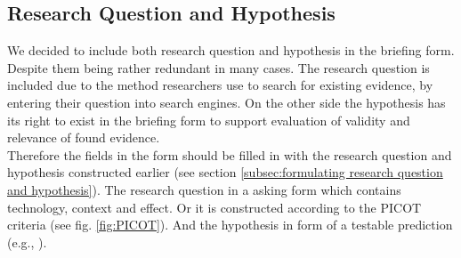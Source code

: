 \subsection{Research Question and Hypothesis}
\label{subsec:research question and hypothesis}

We decided to include both research question and hypothesis in the briefing form. Despite them being rather redundant in many cases. The research question is included due to the method researchers use to search for existing evidence, by entering their question into search engines. On the other side the hypothesis has its right to exist in the briefing form to support evaluation of validity and relevance of found evidence. \\
Therefore the fields in the form should be filled in with the research question and hypothesis constructed earlier (see section \ref{subsec:formulating research question and hypothesis}). The research question in a asking form which contains technology, context and effect. Or it is constructed according to the PICOT criteria (see fig. \ref{fig:PICOT}). And the hypothesis in form of a testable prediction (e.g.,  \cite{Buddies2010}).